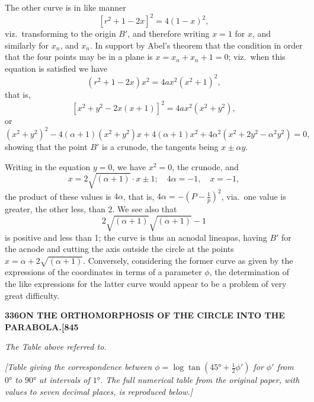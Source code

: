 \documentclass[11pt,a4paper]{book}
\begin{document}
The other curve is in like manner
\[
[r^2 + 1 - 2x]^2 = 4(1 - x)^2,
\]
viz.\ transforming to the origin $B'$, and therefore writing $x = 1$ for $x$, and similarly for $x_n$, and $x_n$. In support by Abel's theorem that the condition in order that the four points may be in a plane is $x = x_n + x_n + 1 = 0$; viz.\ when this equation is satisfied we have
\[
(r^2 + 1 - 2x)x^2 = 4ax^2(x^2 + 1)^2,
\]
that is,
\[
[x^2 + y^2 - 2x(x + 1)]^2 = 4ax^2(x^2 + y^2),
\]
or
\[
(x^2 + y^2)^2 - 4(\alpha + 1)(x^2 + y^2)x + 4(\alpha + 1)x^2 + 4\alpha^2(x^2 + 2y^2 - \alpha^2y^2) = 0,
\]
showing that the point $B'$ is a crunode, the tangents being $x \pm \alpha y$.

Writing in the equation $y = 0$, we have $x^2 = 0$, the crunode, and
\[
x = 2\sqrt{(\alpha + 1)} \cdot x \pm 1; \quad 4\alpha = -1, \quad x = -1,
\]
the product of these values is $4\alpha$, that is, $4\alpha = -\left(P - \frac{1}{p}\right)^2$, via.\ one value is greater, the other less, than 2. We see also that
\[
2\sqrt{(\alpha + 1)}\sqrt{(\alpha + 1)} - 1
\]
is positive and less than 1; the curve is thus an acnodal lineapas, having $B'$ for the acnode and cutting the axis outside the circle at the points $x = \alpha + 2\sqrt{(\alpha + 1)}$. Conversely, considering the former curve as given by the expressions of the coordinates in terms of a parameter $\phi$, the determination of the like expressions for the latter curve would appear to be a problem of very great difficulty.

\newpage
\setcounter{page}{336}

\noindent\textbf{336}\hfill\textbf{ON THE ORTHOMORPHOSIS OF THE CIRCLE INTO THE PARABOLA.}\hfill\textbf{[845}

\bigskip

\begin{center}
\textit{The Table above referred to.}
\end{center}

\medskip

\noindent\textit{[Table giving the correspondence between $\phi = \log\tan(45° + \tfrac{1}{2}\phi')$ for $\phi'$ from $0°$ to $90°$ at intervals of $1°$. The full numerical table from the original paper, with values to seven decimal places, is reproduced below.]}

\medskip
\end{document}
